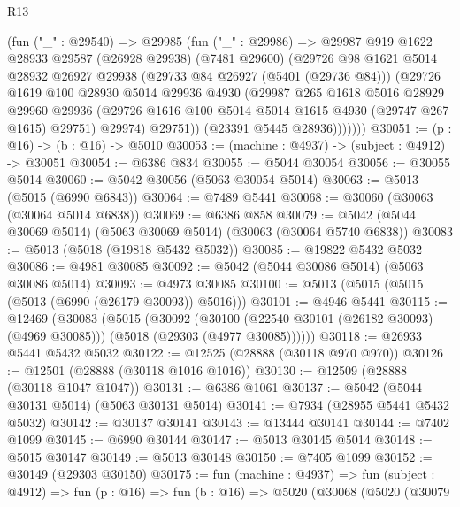 \begin{lexlean}{R13}
\begin{coremodule}
            (fun ("_" : @29540) =>
            @29985
              (fun ("_" : @29986) =>
              @29987
                @919
                @1622
                @28933
                @29587
                (@26928 @29938)
                (@7481 @29600)
                (@29726
                  @98
                  @1621
                  @5014
                  @28932
                  @26927
                  @29938
                  (@29733 @84 @26927 (@5401 (@29736 @84)))
                  (@29726
                    @1619
                    @100
                    @28930
                    @5014
                    @29936
                    @4930
                    (@29987
                      @265
                      @1618
                      @5016
                      @28929
                      @29960
                      @29936
                      (@29726 @1616 @100 @5014 @5014 @1615 @4930 (@29747 @267 @1615) @29751)
                      @29974)
                    @29751))
                (@23391 @5445 @28936)))))))
@30051 := (p : @16) -> (b : @16) -> @5010
@30053 := (machine : @4937) -> (subject : @4912) -> @30051
@30054 := @6386 @834
@30055 := @5044 @30054
@30056 := @30055 @5014
@30060 := @5042 @30056 (@5063 @30054 @5014)
@30063 := @5013 (@5015 (@6990 @6843))
@30064 := @7489 @5441
@30068 := @30060 (@30063 (@30064 @5014 @6838))
@30069 := @6386 @858
@30079 := @5042 (@5044 @30069 @5014) (@5063 @30069 @5014) (@30063 (@30064 @5740 @6838))
@30083 := @5013 (@5018 (@19818 @5432 @5032))
@30085 := @19822 @5432 @5032
@30086 := @4981 @30085
@30092 := @5042 (@5044 @30086 @5014) (@5063 @30086 @5014)
@30093 := @4973 @30085
@30100 := @5013 (@5015 (@5015 (@5013 (@6990 (@26179 @30093)) @5016)))
@30101 := @4946 @5441
@30115 := @12469
    (@30083
      (@5015
        (@30092
          (@30100 (@22540 @30101 (@26182 @30093) (@4969 @30085)))
          (@5018 (@29303 (@4977 @30085))))))
@30118 := @26933 @5441 @5432 @5032
@30122 := @12525 (@28888 (@30118 @970 @970))
@30126 := @12501 (@28888 (@30118 @1016 @1016))
@30130 := @12509 (@28888 (@30118 @1047 @1047))
@30131 := @6386 @1061
@30137 := @5042 (@5044 @30131 @5014) (@5063 @30131 @5014)
@30141 := @7934 (@28955 @5441 @5432 @5032)
@30142 := @30137 @30141
@30143 := @13444 @30141
@30144 := @7402 @1099
@30145 := @6990 @30144
@30147 := @5013 @30145 @5014
@30148 := @5015 @30147
@30149 := @5013 @30148
@30150 := @7405 @1099
@30152 := @30149 (@29303 @30150)
@30175 := fun (machine : @4937) =>
  fun (subject : @4912) =>
  fun (p : @16) =>
  fun (b : @16) =>
  @5020
    (@30068
      (@5020
        (@30079

\end{coremodule}
\end{lexlean}
